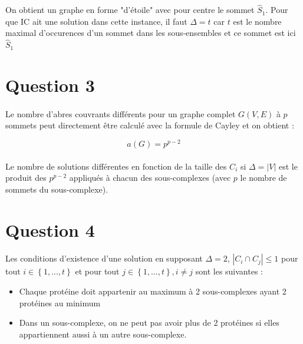 \documentclass[11pt]{article}
\begin{document}
On obtient un graphe en forme "d'étoile" avec pour centre le sommet $\widehat{S}_1$. Pour que IC ait une solution
dans cette instance, il faut $\Delta = t$ car $t$ est le nombre maximal d'occurences d'un sommet dans les sous-ensembles
et ce sommet est ici $\widehat{S}_1$

\section{Question 3}
\paragraph{}
Le nombre d'abres couvrants différents pour un graphe complet $G(V,E)$ à $p$ sommets peut directement être calculé
avec la formule de Cayley et on obtient :

\begin{equation}
	a(G) = p^{p-2} 
\end{equation}

\paragraph{}
Le nombre de solutions différentes en fonction de la taille des $C_i$ si $\Delta = |V|$
est le produit des $p^{p-2}$ appliqués à chacun des sous-complexes (avec $p$ le 
nombre de sommets du sous-complexe).

\section{Question 4}
\paragraph{}
Les conditions d'existence d'une solution en supposant $\Delta=2$, $|C_i \cap C_j| \leq 1$ pour tout $i \in \left\{1,...,t\right\}$ et pour tout
$j \in \left\{1,...,t\right\} , i\ne j$ sont les suivantes :
\begin{itemize}
    \item Chaque protéine doit appartenir au maximum à 2 sous-complexes ayant
2 protéines au minimum
    \item Dans un sous-complexe, on ne peut pas avoir plus de 2 protéines si elles
appartiennent aussi à un autre sous-complexe.
\end{itemize}
\end{document}
